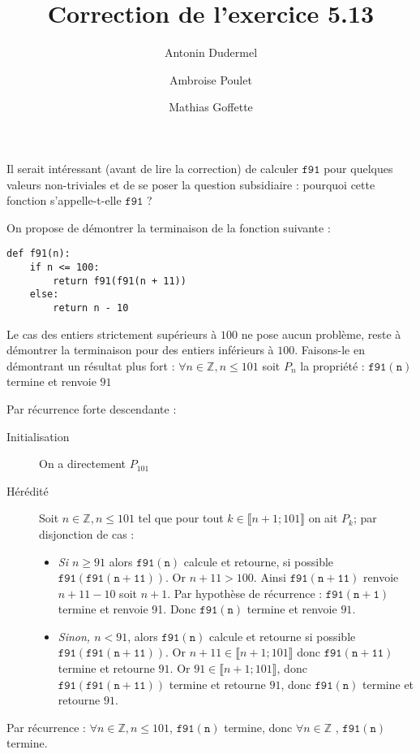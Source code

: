 \documentclass[11pt,a4paper]{article}
\title{Correction de l'exercice 5.13}
\date{}
\author{Antonin Dudermel \and Ambroise Poulet \and Mathias Goffette}
\begin{document}

\maketitle

\begin{it}
Il serait intéressant (avant de lire la correction) de calculer \;$\mathtt{f91}$ pour quelques valeurs non-triviales et de se poser la question subsidiaire : pourquoi cette fonction s'appelle-t-elle \;$\mathtt{f91}$ ?
\end{it}
\par
On propose de démontrer la terminaison de la fonction suivante :

\begin{lstlisting}
def f91(n):
    if n <= 100:
        return f91(f91(n + 11))
    else:
        return n - 10
\end{lstlisting}

\par
Le cas des entiers strictement supérieurs à $100$ ne pose aucun problème, reste à démontrer la terminaison pour des entiers inférieurs à $100$.
Faisons-le en démontrant un résultat plus fort : $\forall n \in \mathbb{Z}, n\leqslant 101$ soit $P_n$ la propriété : \og{} $\mathtt{f91(n)}$ termine et renvoie $91$ \fg{}
\par
Par récurrence forte descendante :\\
\begin{description}
\item[Initialisation] \quad On a directement $P_{101}$
\item[Hérédité] \quad Soit $n\in \mathbb{Z}, n \leqslant 101$ tel que pour tout $ k \in \llbracket n+1;101\rrbracket$ on ait $P_{k}$; par disjonction de cas : 
\begin{itemize}[\textbullet]
	\item {\itshape Si $n\geqslant 91$ } alors $\mathtt{f91(n)}$ calcule et retourne, si possible $\mathtt{f91(f91(n+11))}$. Or $n+11 > 100$. Ainsi $\mathtt{f91(n+11)}$ renvoie $n+11-10$ soit $n+1$. Par hypothèse de récurrence : $\mathtt{f91(n+1)}$ termine et renvoie 91. Donc $\mathtt{f91(n)}$ termine et renvoie $91$.
	\item {\itshape Sinon, $n < 91$}, alors $\mathtt{f91(n)}$ calcule et retourne si possible $\mathtt{f91(f91(n+11))}$. Or $n+11\in \llbracket n+1;101 \rrbracket$ donc $\mathtt{f91(n+11)}$ termine et retourne $91$. Or $91 \in \llbracket n+1;101 \rrbracket$, donc $\mathtt{f91(f91(n+11))}$ termine et retourne $91$, donc $\mathtt{f91(n)}$ termine et retourne $91$.
\end{itemize}
\end{description}
Par récurrence : $\forall n \in \mathbb{Z}, n \leqslant 101$, $\mathtt{f91(n)}$ termine,
donc $\forall n \in \mathbb{Z}$ , $\mathtt{f91(n)}$ termine.
\end{document}
